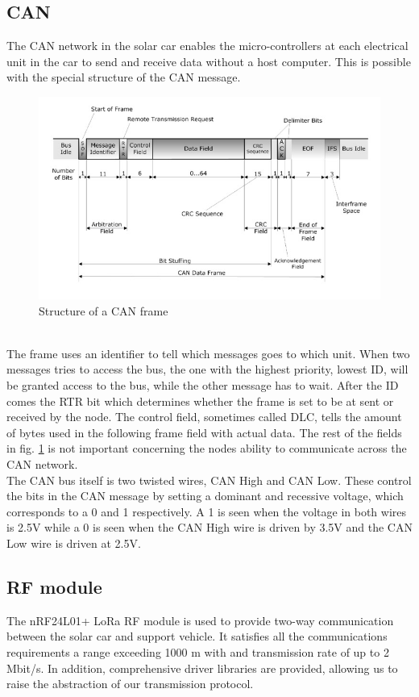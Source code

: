 \documentclass[conference]{IEEEtran}
\begin{document}
\subsection{CAN} %
The CAN network in the solar car enables the micro-controllers at each electrical unit in the car to send and receive data without a host computer. This is possible with the special structure of the CAN message.\\
\begin{figure}[h]
    \includegraphics[scale=0.35]{documentation/images/detailed-can-data-frame-architecture.jpg}
    \caption{Structure of a CAN frame}
    \label{fig:CANframe}
\end{figure}\\
The frame uses an identifier to tell which messages goes to which unit. When two messages tries to access the bus, the one with the highest priority, lowest ID, will be granted access to the bus, while the other message has to wait. After the ID comes the RTR bit which determines whether the frame is set to be at sent or received by the node. The control field, sometimes called DLC, tells the amount of bytes used in the following frame field with actual data. The rest of the fields in fig. \ref{fig:CANframe} is not important concerning the nodes ability to communicate across the CAN network.\\
The CAN bus itself is two twisted wires, CAN High and CAN Low. These control the bits in the CAN message by setting a dominant and recessive voltage, which corresponds to a 0 and 1 respectively. A 1 is seen when the voltage in both wires is 2.5V while a 0 is seen when the CAN High wire is driven by 3.5V and the CAN Low wire is driven at 2.5V. 
\subsection{RF module} %
The nRF24L01+ LoRa RF module is used to provide two-way communication between the solar car and support vehicle. It satisfies all the communications requirements a range exceeding 1000 m with and transmission rate of up to 2 Mbit/s. In addition, comprehensive driver libraries are provided, allowing us to raise the abstraction of our transmission protocol. \\
\end{document}
